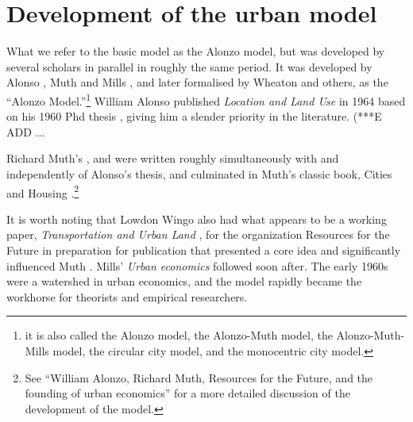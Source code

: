 \section{Development of the urban model}
What we refer to the basic model as the Alonzo model, but was developed by several scholars in parallel in roughly the same period. 
It was developed by 
Alonso \cite{alonsoLocationLandUse1964}, Muth \cite{muthCitiesHousingSpatial1969} and Mills \cite{millsAggregativeModelResource1967}, and later formalised by Wheaton \cite{wheatonComparativeStaticAnalysis1974} and others, as the ``Alonzo Model.''\footnote{it is also called the Alonzo model, the Alonzo-Muth model, the Alonzo-Muth-Mills model, the circular city model, and the monocentric city model.} William Alonso published \textit{Location and Land Use} in 1964  \cite{alonsoLocationLandUse1964} based on his 1960 Phd thesis \cite{alonsoModelUrbanLand1960},  
giving him a slender priority in the literature.  (***E ADD ... %

Richard Muth's \cite{muthSpatialStructureHousing1961}, and \cite{muthRationalExpectationsTheory1961}  were written roughly simultaneously with and independently of Alonso's thesis, and  culminated in Muth's classic book, Cities and Housing  \cite{muthCitiesHousingSpatial1969}.\footnote{See ``William Alonzo, Richard Muth, Resources for  the Future, and the founding of urban economics''\cite{mcdonaldWilliamAlonsoRichard2007} for a more detailed discussion of the development of the model.}  %

It is worth noting that Lowdon Wingo also had what appears to be a working paper, \textit{Transportation and Urban Land} \cite{wingoTransportationUrbanLand1961}, for the organization Resources for the Future  in preparation for publication that presented a core idea and  significantly influenced Muth \cite{mcdonaldWilliamAlonsoRichard2007}. Mills' \textit{Urban economics} \cite{millsUrbanEconomics1972} followed soon after. The early 1960s were a watershed in urban economics, and the model rapidly became the workhorse for theorists and empirical researchers.


